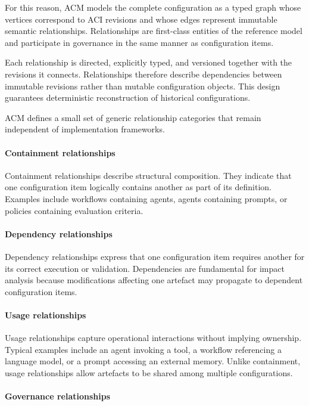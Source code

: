 \documentclass[10pt]{article}
\begin{document}
For this reason, ACM models the complete configuration as a typed graph whose vertices correspond to ACI revisions and whose edges represent immutable semantic relationships. Relationships are first-class entities of the reference model and participate in governance in the same manner as configuration items.

Each relationship is directed, explicitly typed, and versioned together with the revisions it connects. Relationships therefore describe dependencies between immutable revisions rather than mutable configuration objects. This design guarantees deterministic reconstruction of historical configurations.

ACM defines a small set of generic relationship categories that remain independent of implementation frameworks.

\paragraph{Containment relationships}

Containment relationships describe structural composition. They indicate that one configuration item logically contains another as part of its definition. Examples include workflows containing agents, agents containing prompts, or policies containing evaluation criteria.

\paragraph{Dependency relationships}

Dependency relationships express that one configuration item requires another for its correct execution or validation. Dependencies are fundamental for impact analysis because modifications affecting one artefact may propagate to dependent configuration items.

\paragraph{Usage relationships}

Usage relationships capture operational interactions without implying ownership. Typical examples include an agent invoking a tool, a workflow referencing a language model, or a prompt accessing an external memory. Unlike containment, usage relationships allow artefacts to be shared among multiple configurations.

\paragraph{Governance relationships}
\end{document}
